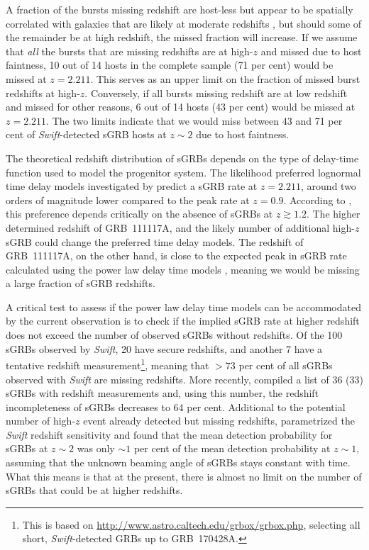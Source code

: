 \documentclass{aa}    %
\begin{document}
A fraction of the bursts missing redshift are host-less but appear to be
spatially correlated with galaxies that are likely at moderate redshifts
\citep{Tunnicliffe2014}, but should some of the remainder be at high redshift,
the missed fraction will increase. If we assume that \textit{all} the bursts
that are missing redshifts are at high-$z$ and missed due to host faintness, 10
out of 14 hosts in the complete sample (71 per cent) would be missed at $z =
2.211$. This serves as an upper limit on the fraction of missed burst redshifts
at high-$z$. Conversely, if all bursts missing redshift are at low redshift and
missed for other reasons, 6 out of 14 hosts (43 per cent) would be missed at $z
= 2.211$. The two limits indicate that we would miss between 43 and 71 per cent
of \textit{Swift}-detected sGRB hosts at $z \sim 2$ due to host faintness.

The theoretical redshift distribution of sGRBs depends on the type of delay-time
function used to model the progenitor system. The likelihood preferred lognormal
time delay models investigated by \citet{Wanderman2015} predict a sGRB rate at
$z = 2.211$, around two orders of magnitude lower compared to the peak rate at
$z = 0.9$. According to \citet{Wanderman2015}, this preference depends
critically on the absence of sGRBs at $z \gtrsim 1.2$. The higher determined
redshift of GRB~111117A, and the likely number of additional high-$z$ sGRB could
change the preferred time delay models. The redshift of GRB~111117A, on the
other hand, is close to the expected peak in sGRB rate calculated using the
power law delay time models \citep{Behroozi2014, Wanderman2015, Ghirlanda2016},
meaning we would be missing a large fraction of sGRB redshifts.

A critical test to assess if the power law delay time models can be accommodated
by the current observation is to check if the implied sGRB rate at higher
redshift does not exceed the number of observed sGRBs without redshifts. Of the
100  sGRBs observed by \textit{Swift}, 20 have secure redshifts, and another 7
have a tentative redshift measurement\footnote{This is based on
	\url{http://www.astro.caltech.edu/grbox/grbox.php}, selecting all short,
	\textit{Swift}-detected GRBs up to GRB~170428A.}, meaning that $> 73$ per cent of all
sGRBs observed with \textit{Swift} are missing redshifts. More recently,
\citet{Fong2017} \citep{LIGOScientificCollaboration2017b} compiled a list of 36
(33) sGRBs with redshift measurements and, using this number, the redshift
incompleteness of sGRBs decreases to 64 per cent. Additional to the potential
number of high-$z$ event already detected but missing redshifts,
\citet{Behroozi2014} parametrized the \textit{Swift} redshift sensitivity and
found that the mean detection probability for sGRBs at $z \sim2$ was only $\sim1$
per cent of the mean detection probability at $z \sim1$, assuming that the
unknown beaming angle of sGRBs stays constant with time. What this means is that
at the present, there is almost no limit on the number of sGRBs that could be at
higher redshifts.
\end{document}
